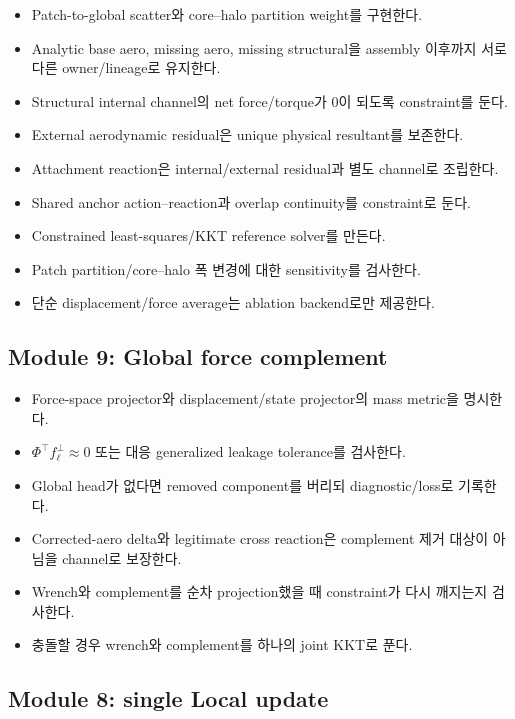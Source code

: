\documentclass[10pt,a4paper]{article}
\newcommand{\todo}{\textcolor{TodoGray}{\(\square\)}}
\begin{document}
\begin{itemize}
  \item[\todo] Patch-to-global scatter와 core--halo partition weight를 구현한다.
  \item[\todo] Analytic base aero, missing aero, missing structural을 assembly 이후까지 서로 다른 owner/lineage로 유지한다.
  \item[\todo] Structural internal channel의 net force/torque가 0이 되도록 constraint를 둔다.
  \item[\todo] External aerodynamic residual은 unique physical resultant를 보존한다.
  \item[\todo] Attachment reaction은 internal/external residual과 별도 channel로 조립한다.
  \item[\todo] Shared anchor action--reaction과 overlap continuity를 constraint로 둔다.
  \item[\todo] Constrained least-squares/KKT reference solver를 만든다.
  \item[\todo] Patch partition/core--halo 폭 변경에 대한 sensitivity를 검사한다.
  \item[\todo] 단순 displacement/force average는 ablation backend로만 제공한다.
\end{itemize}

\subsection*{Module 9: Global force complement}

\begin{itemize}
  \item[\todo] Force-space projector와 displacement/state projector의 mass metric을 명시한다.
  \item[\todo] \(\Phi^\top f_\ell^\perp\approx0\) 또는 대응 generalized leakage tolerance를 검사한다.
  \item[\todo] Global head가 없다면 removed component를 버리되 diagnostic/loss로 기록한다.
  \item[\todo] Corrected-aero delta와 legitimate cross reaction은 complement 제거 대상이 아님을 channel로 보장한다.
  \item[\todo] Wrench와 complement를 순차 projection했을 때 constraint가 다시 깨지는지 검사한다.
  \item[\todo] 충돌할 경우 wrench와 complement를 하나의 joint KKT로 푼다.
\end{itemize}

\subsection*{Module 8: single Local update}
\end{document}
